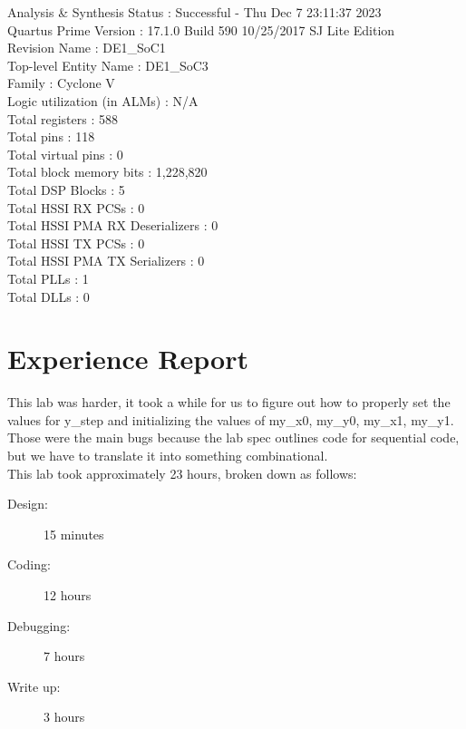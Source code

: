 \documentclass[11pt, titlepage]{article}
\begin{document}
\begin{description}
                    Analysis \& Synthesis Status : Successful - Thu Dec  7 23:11:37 2023 \\
                    Quartus Prime Version : 17.1.0 Build 590 10/25/2017 SJ Lite Edition \\
                    Revision Name : DE1\_SoC1 \\
                    Top-level Entity Name : DE1\_SoC3 \\
                    Family : Cyclone V \\
                    Logic utilization (in ALMs) : N/A \\
                    Total registers : 588 \\
                    Total pins : 118 \\
                    Total virtual pins : 0 \\
                    Total block memory bits : 1,228,820 \\
                    Total DSP Blocks : 5 \\
                    Total HSSI RX PCSs : 0 \\
                    Total HSSI PMA RX Deserializers : 0 \\
                    Total HSSI TX PCSs : 0 \\
                    Total HSSI PMA TX Serializers : 0 \\
                    Total PLLs : 1 \\
                    Total DLLs : 0 \\
            \end{description}
            
    \newpage
    \section{Experience Report}
        This lab was harder, it took a while for us to figure out how to properly set the values for y\_step and initializing the values of my\_x0, my\_y0, my\_x1, my\_y1. Those were the main bugs because the lab spec outlines code for sequential code, but we have to translate it into something combinational. \\

        This lab took approximately 23 hours, broken down as follows:
        \begin{description}
            \item[Design:] 15 minutes
            \item[Coding:] 12 hours
            \item[Debugging:] 7 hours
            \item[Write up:] 3 hours
        \end{description}   
        
\end{document}
